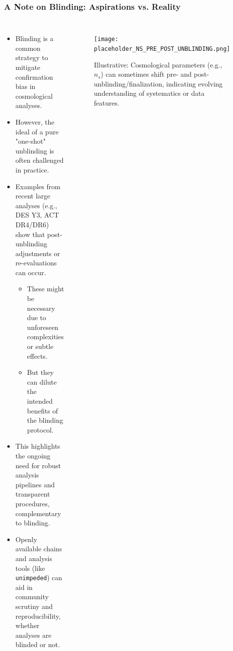 \documentclass[aspectratio=169]{beamer}
\begin{document}
\begin{frame}
    \frametitle{A Note on Blinding: Aspirations vs. Reality}
    \begin{columns}[T]
        \begin{itemize}
            \item Blinding is a common strategy to mitigate confirmation bias in cosmological analyses.
            \item However, the ideal of a pure "one-shot" unblinding is often challenged in practice.
            \item Examples from recent large analyses (e.g., DES Y3, ACT DR4/DR6) show that post-unblinding adjustments or re-evaluations can occur.
                \begin{itemize}
                    \item These might be necessary due to unforeseen complexities or subtle effects.
                    \item But they can dilute the intended benefits of the blinding protocol.
                \end{itemize}
            \item This highlights the ongoing need for robust analysis pipelines and transparent procedures, complementary to blinding.
            \item Openly available chains and analysis tools (like \texttt{unimpeded}) can aid in community scrutiny and reproducibility, whether analyses are blinded or not.
        \end{itemize}
        \begin{figure}
            \centering
            \texttt{[image: placeholder\_NS\_PRE\_POST\_UNBLINDING.png]}
            \caption{Illustrative: Cosmological parameters (e.g., $n_s$) can sometimes shift pre- and post-unblinding/finalization, indicating evolving understanding of systematics or data features.}
        \end{figure}
    \end{columns}
\end{frame}
\end{document}
